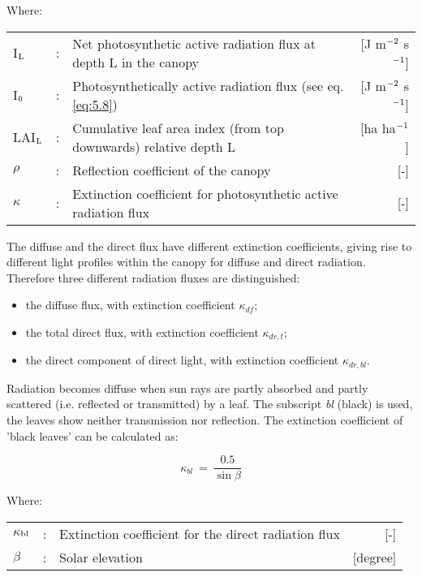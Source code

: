 Where:\\[5pt]
\begin{tabularx}{\textwidth}{llXr}
I$_{{\rm L}}$   &:& Net photosynthetic active radiation flux at 
    depth L in the canopy    &    [J m$^{{\rm -2}}$ s$^{{\rm -1}}$]\\
I$_{{\rm 0}}$   &:& Photosynthetically active radiation flux (see eq. \ref{eq:5.8})  & 
    [J m$^{{\rm -2}}$ s$^{{\rm -1}}$]\\
LAI$_{{\rm L}}$ &:& Cumulative leaf area index (from top downwards) 
    relative depth L & [ha ha$^{{\rm -1}}$]\\
$\rho$          &:& Reflection coefficient of the canopy   &     [-]\\
$\kappa$        &:& Extinction coefficient for photosynthetic active 
    radiation flux   &     [-]\\
\end{tabularx}

The diffuse and the direct flux have different extinction coefficients, giving rise to
different light profiles within the canopy for diffuse and direct radiation. Therefore three
different radiation fluxes are distinguished:
\begin{itemize}
\item the diffuse flux, with extinction coefficient $\kappa_{df}$;
\item the total direct flux, with extinction coefficient $\kappa_{dr,t}$;
\item the direct component of direct light, with extinction coefficient $\kappa_{dr,bl}$.
\end{itemize}

Radiation becomes diffuse when sun rays are partly absorbed and partly scattered (i.e.
reflected or transmitted) by a leaf. The subscript {\it bl} (black) is used, the leaves show
neither transmission nor reflection. The extinction coefficient of 'black leaves'
can be calculated as:

\begin{equation}
\label{eq:5.14}
\kappa_{bl} ~=~{\frac{0.5}{\sin \beta }}
\end{equation}

Where:\\[5pt]
\begin{tabularx}{\textwidth}{llXr}
$\kappa$$_{{\rm bl}}$ &:& Extinction coefficient for the direct radiation flux   &     [-]\\
$\beta$ &:& Solar elevation    &    [degree]\\
\end{tabularx}

